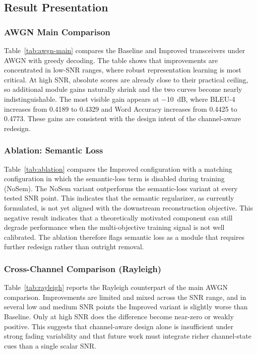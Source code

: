 \FloatBarrier
\subsection{Result Presentation}

\subsubsection{AWGN Main Comparison}


Table~\ref{tab:awgn-main} compares the Baseline and Improved transceivers under AWGN with greedy decoding. The table shows that improvements are concentrated in low-SNR ranges, where robust representation learning is most critical. At high SNR, absolute scores are already close to their practical ceiling, so additional module gains naturally shrink and the two curves become nearly indistinguishable. The most visible gain appears at \SI{-10}{dB}, where BLEU-4 increases from 0.4189 to 0.4329 and Word Accuracy increases from 0.4425 to 0.4773. These gains are consistent with the design intent of the channel-aware redesign.

\subsubsection{Ablation: Semantic Loss}


Table~\ref{tab:ablation} compares the Improved configuration with a matching configuration in which the semantic-loss term is disabled during training (NoSem). The NoSem variant outperforms the semantic-loss variant at every tested SNR point. This indicates that the semantic regularizer, as currently formulated, is not yet aligned with the downstream reconstruction objective. This negative result indicates that a theoretically motivated component can still degrade performance when the multi-objective training signal is not well calibrated. The ablation therefore flags semantic loss as a module that requires further redesign rather than outright removal.

\subsubsection{Cross-Channel Comparison (Rayleigh)}


Table~\ref{tab:rayleigh} reports the Rayleigh counterpart of the main AWGN comparison. Improvements are limited and mixed across the SNR range, and in several low and medium SNR points the Improved variant is slightly worse than Baseline. Only at high SNR does the difference become near-zero or weakly positive. This suggests that channel-aware design alone is insufficient under strong fading variability and that future work must integrate richer channel-state cues than a single scalar SNR.

